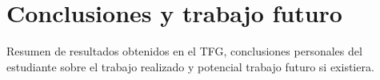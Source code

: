 \chapter{Conclusiones y trabajo futuro}

Resumen de resultados obtenidos en el TFG, conclusiones personales del
estudiante sobre el trabajo realizado y potencial trabajo futuro si
existiera.

